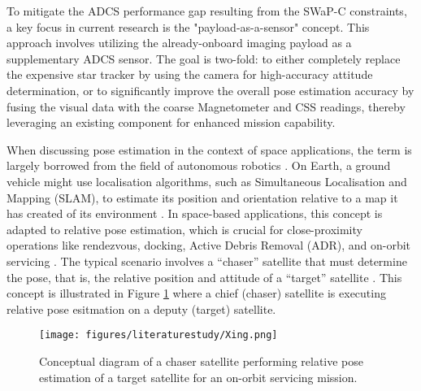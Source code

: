\noindent
To mitigate the ADCS performance gap resulting from the SWaP-C constraints, a key focus in current research is 
the "payload-as-a-sensor" concept. This approach involves utilizing the already-onboard imaging 
payload as a supplementary ADCS sensor. The goal is two-fold: to either completely replace the expensive star tracker 
by using the camera for high-accuracy attitude determination, or to significantly improve the overall pose estimation accuracy
by fusing the visual data with the coarse Magnetometer and CSS readings, thereby leveraging an existing component for enhanced mission capability.


\noindent
When discussing pose estimation in the context of space applications, the term is largely borrowed from the field of autonomous robotics \cite{Korf}. 
On Earth, a ground vehicle might use localisation algorithms, such as Simultaneous Localisation and Mapping (SLAM), to estimate its position and orientation 
relative to a map it has created of its environment \cite{Korf, Sabatini}. In space-based applications, this concept is adapted to relative pose estimation, which is crucial for close-proximity operations like rendezvous, docking, Active Debris Removal (ADR), and on-orbit servicing \cite{Sabatini, Xing, deJongh2019}. The typical scenario involves a ``chaser'' satellite that must determine the pose, that is, the relative position and attitude of a ``target'' satellite \cite{Meng, Sabatini, Kisantal, Xing, deJongh2019}. This concept is illustrated in Figure \ref{fig:relative_pose_concept} where a chief (chaser) satellite is executing relative pose esitmation on a deputy (target) satellite.

\begin{figure}[H]
    \centering
    \texttt{[image: figures/literaturestudy/Xing.png]}
    \caption{Conceptual diagram of a chaser satellite performing relative pose estimation of a target satellite for an on-orbit servicing mission. \cite{Xing}}
    \label{fig:relative_pose_concept}
\end{figure}


